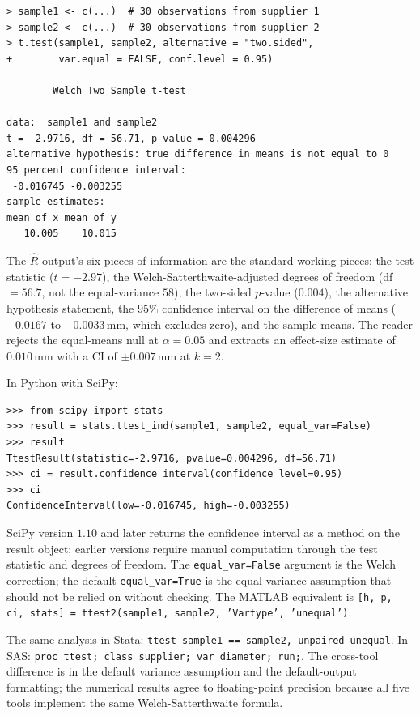 \begin{verbatim}
> sample1 <- c(...)  # 30 observations from supplier 1
> sample2 <- c(...)  # 30 observations from supplier 2
> t.test(sample1, sample2, alternative = "two.sided",
+        var.equal = FALSE, conf.level = 0.95)

        Welch Two Sample t-test

data:  sample1 and sample2
t = -2.9716, df = 56.71, p-value = 0.004296
alternative hypothesis: true difference in means is not equal to 0
95 percent confidence interval:
 -0.016745 -0.003255
sample estimates:
mean of x mean of y
   10.005    10.015
\end{verbatim}

\noindent
The $\hat{R}$ output's six pieces of information are the standard
working pieces: the test statistic ($t = -2.97$), the
Welch-Satterthwaite-adjusted degrees of freedom (df $= 56.7$,
not the equal-variance $58$), the two-sided $p$-value ($0.004$),
the alternative hypothesis statement, the $95\%$ confidence
interval on the difference of means ($-0.0167$ to $-0.0033\,\si{
\milli\meter}$, which excludes zero), and the sample means.
The reader rejects the equal-means null at $\alpha = 0.05$ and
extracts an effect-size estimate of $0.010\,\si{\milli\meter}$
with a CI of $\pm 0.007\,\si{\milli\meter}$ at $k = 2$.

In Python with SciPy:

\begin{verbatim}
>>> from scipy import stats
>>> result = stats.ttest_ind(sample1, sample2, equal_var=False)
>>> result
TtestResult(statistic=-2.9716, pvalue=0.004296, df=56.71)
>>> ci = result.confidence_interval(confidence_level=0.95)
>>> ci
ConfidenceInterval(low=-0.016745, high=-0.003255)
\end{verbatim}

\noindent
SciPy version $1.10$ and later returns the confidence interval
as a method on the result object; earlier versions require manual
computation through the test statistic and degrees of freedom. The
\texttt{equal\_var=False} argument is the Welch correction; the
default \texttt{equal\_var=True} is the equal-variance assumption
that should not be relied on without checking. The MATLAB
equivalent is \texttt{[h, p, ci, stats] = ttest2(sample1,
sample2, 'Vartype', 'unequal')}.

The same analysis in Stata: \texttt{ttest sample1 == sample2,
unpaired unequal}. In SAS: \texttt{proc ttest; class supplier;
var diameter; run;}. The cross-tool difference is in the default
variance assumption and the default-output formatting; the
numerical results agree to floating-point precision because all
five tools implement the same Welch-Satterthwaite formula.

